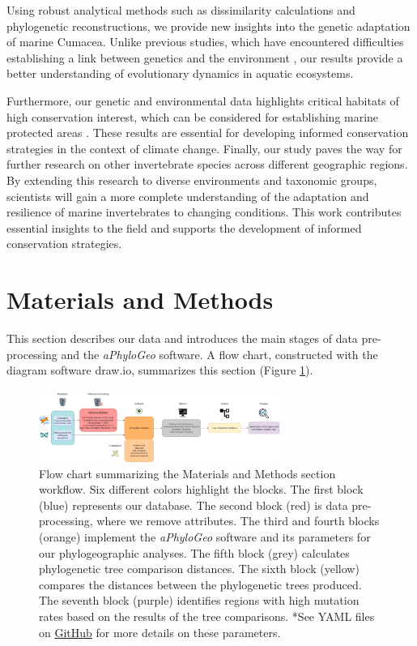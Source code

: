 Using robust analytical methods such as dissimilarity calculations and phylogenetic reconstructions, we provide new insights into the genetic adaptation of marine Cumacea. Unlike previous studies, which have encountered difficulties establishing a link between genetics and the environment \citep{manel2003landscape, balkenhol2009statistical}, our results provide a better understanding of evolutionary dynamics in aquatic ecosystems.

Furthermore, our genetic and environmental data highlights critical habitats of high conservation interest, which can be considered for establishing marine protected areas \citep{levin2009ecological}. These results are essential for developing informed conservation strategies in the context of climate change. Finally, our study paves the way for further research on other invertebrate species across different geographic regions. By extending this research to diverse environments and taxonomic groups, scientists will gain a more complete understanding of the adaptation and resilience of marine invertebrates to changing conditions. This work contributes essential insights to the field and supports the development of informed conservation strategies.

\section{Materials and Methods}\label{materials-methods}
This section describes our data and introduces the main stages of data pre-processing and the \textit{aPhyloGeo} software. A flow chart, constructed with the diagram software draw.io, summarizes this section (Figure \ref{fig:fig1}).

\begin{figure}[htbp]
    \centering
    \includegraphics[width=0.7\textwidth]{diagram.drawio.png}
    \caption{Flow chart summarizing the Materials and Methods section workflow. Six different colors highlight the blocks. The first block (blue) represents our database. The second block (red) is data pre-processing, where we remove attributes. The third and fourth blocks (orange) implement the \textit{aPhyloGeo} software and its parameters for our phylogeographic analyses. The fifth block (grey) calculates phylogenetic tree comparison distances. The sixth block (yellow) compares the distances between the phylogenetic trees produced. The seventh block (purple) identifies regions with high mutation rates based on the results of the tree comparisons. *See YAML files on \href{https://github.com/tahiri-lab/aPhyloGeo}{GitHub} for more details on these parameters. \label{fig:fig1}}
\end{figure}

